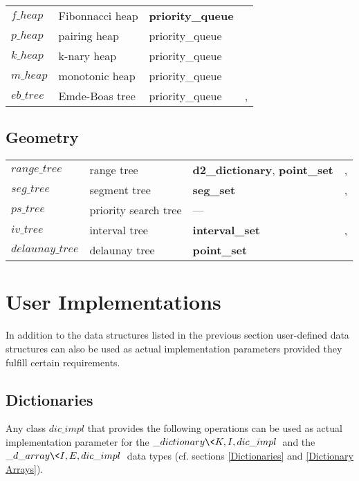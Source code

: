 \begin{tabular}{llll}
$f\_heap$  &Fibonnacci heap    &{\bf priority\_queue} &\cite{FT87}\\
$p\_heap$  &pairing heap       &priority\_queue       &\cite{SV87}\\
$k\_heap$  &k-nary heap        &priority\_queue       &\cite{M84}\\
$m\_heap$  &monotonic heap     &priority\_queue       &\cite{M84}\\
$eb\_tree$ &Emde-Boas tree     &priority\_queue       &\cite{EKZ77}, \cite{We92}
\end{tabular}

\subsection{Geometry}

\begin{tabular}{llll}
$range\_tree$ &range tree     &{\bf d2\_dictionary}, {\bf point\_set}&\cite{Wi85}, \cite{Lu78}\\
$seg\_tree$   &segment tree         &{\bf seg\_set}      &\cite{B79}, \cite{Ed82}\\
$ps\_tree$    &priority search tree &---             &\cite{MC81}\\
$iv\_tree$    &interval tree        &{\bf interval\_set} &\cite{MC80}, \cite{Ed82}\\
$delaunay\_tree$ &delaunay tree     &{\bf point\_set}    &\cite{De92}
\end{tabular}

\newpage

\section{User Implementations}

\label{User Implementations}

In addition to the data structures listed in the previous section user-defined 
data structures can also be used as actual implementation parameters provided 
they fulfill certain requirements.

\subsection{Dictionaries}

\label{User Implementations Dictionaries}

Any class $dic\_impl$ that provides the following operations can be used as 
actual implementation parameter for the $\_dictionary\<K,I,dic\_impl\>$ 
and the $\_d\_array\<I,E,dic\_impl\>$ data types (cf. sections \ref{Dictionaries} and \ref{Dictionary Arrays}).

